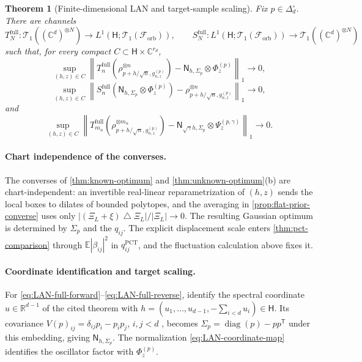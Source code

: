 \documentclass[11pt]{article}
\newtheorem{theorem}{Theorem}[section]
\theoremstyle{remark}
\theoremstyle{plain}
\newcommand{\C}{\mathbb C}
\newcommand{\R}{\mathbb R}
\newcommand{\cF}{\mathcal F}
\newcommand{\cT}{\mathcal T}
\newcommand{\diag}{\operatorname{diag}}
\newcommand{\ot}{\otimes}
\begin{document}
\begin{samepage}
\begin{theorem}[Finite-dimensional LAN and target-sample scaling]
\label{thm:LAN-full}
Fix \(p\in\Delta_d^\circ\).  There are channels
\[
  T_N^{\mathrm{full}}:
  \cT_1((\C^d)^{\ot N})
  \longrightarrow L^1(\mathsf H;\cT_1(\cF_{\mathrm{orb}})),
  \qquad
  S_N^{\mathrm{full}}:
  L^1(\mathsf H;\cT_1(\cF_{\mathrm{orb}}))
  \longrightarrow\cT_1((\C^d)^{\ot N})
\]
such that, for every compact
\(C\subset\mathsf H\times\C^{r_d}\),
\begin{equation}\label{eq:LAN-full-forward}
  \sup_{(h,z)\in C}
  \left\|
    T_n^{\mathrm{full}}\!\left(\rho_{p+h/\sqrt n,g_{n,z}^{(p)}}^{\ot n}\right)
    -\mathsf N_{h,\Sigma_p}\ot\Phi_z^{(p)}
  \right\|_1\longrightarrow0,
\end{equation}
\begin{equation}\label{eq:LAN-full-reverse}
  \sup_{(h,z)\in C}
  \left\|
    S_n^{\mathrm{full}}\!\left(\mathsf N_{h,\Sigma_p}\ot\Phi_z^{(p)}\right)
    -\rho_{p+h/\sqrt n,g_{n,z}^{(p)}}^{\ot n}
  \right\|_1\longrightarrow0,
\end{equation}
and
\begin{equation}\label{eq:LAN-full-target}
  \sup_{(h,z)\in C}
  \left\|
    T_{m_n}^{\mathrm{full}}\!\left(
      \rho_{p+h/\sqrt n,g_{n,z}^{(p)}}^{\ot m_n}\right)
    -\mathsf N_{\sqrt\gamma h,\Sigma_p}\ot\Psi_z^{(p,\gamma)}
  \right\|_1\longrightarrow0.
\end{equation}
\end{theorem}
\end{samepage}

\paragraph{Chart independence of the converses.}
The converses of \cref{thm:known-optimum} and
\cref{thm:unknown-optimum}\textup{(b)} are chart-independent: an invertible
real-linear reparametrization of \((h,z)\) sends the local boxes to dilates
of bounded polytopes, and the averaging in
\cref{prop:flat-prior-converse} uses only
\(|(\Xi_L+\xi)\mathbin\triangle\Xi_L|/|\Xi_L|\to0\).
The resulting Gaussian optimum is determined by \(\Sigma_p\) and the
\(q_{ij}\).  The explicit displacement scale enters
\cref{thm:pct-comparison} through \(\mathbb E|\beta_{ij}|^2\) in
\(q_{ij}^{\mathrm{PCT}}\), and the fluctuation calculation above fixes it.

\paragraph{Coordinate identification and target scaling.}
For \eqref{eq:LAN-full-forward}--\eqref{eq:LAN-full-reverse}, identify the
spectral coordinate \(u\in\R^{d-1}\) of the cited theorem with
\(h=(u_1,\ldots,u_{d-1},-\sum_{i<d}u_i)\in\mathsf H\).
Its covariance \(V(p)_{ij}=\delta_{ij}p_i-p_ip_j\), \(i,j<d\)
\cite[Eq.~(3.3)]{KahnGuta2009LANFiniteDimensional}, becomes
\(\Sigma_p=\diag(p)-pp^{\mathsf T}\) under this embedding, giving
\(\mathsf N_{h,\Sigma_p}\). The normalization
\eqref{eq:LAN-coordinate-map} identifies the oscillator factor with
\(\Phi_z^{(p)}\).
\end{document}

